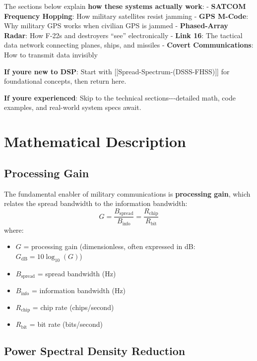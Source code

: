 The sections below explain \textbf{how these systems actually work}: -
\textbf{SATCOM Frequency Hopping}: How military satellites resist
jamming - \textbf{GPS M-Code}: Why military GPS works when civilian GPS
is jammed - \textbf{Phased-Array Radar}: How F-22s and destroyers
``see'' electronically - \textbf{Link 16}: The tactical data network
connecting planes, ships, and missiles - \textbf{Covert Communications}:
How to transmit data invisibly

\textbf{If you\textquotesingle re new to DSP}: Start with
{[}{[}Spread-Spectrum-(DSSS-FHSS){]}{]} for foundational concepts, then
return here.

\textbf{If you\textquotesingle re experienced}: Skip to the technical
sections-\/-\/-detailed math, code examples, and real-world system specs
await.

\section{Mathematical Description}

\subsection{Processing Gain}

The fundamental enabler of military communications is \textbf{processing gain}, which relates the spread bandwidth to the information bandwidth:
\begin{equation}
G = \frac{B_{\text{spread}}}{B_{\text{info}}} = \frac{R_{\text{chip}}}{R_{\text{bit}}}
\label{eq:processing-gain}
\end{equation}
where:
\begin{itemize}
\item $G$ = processing gain (dimensionless, often expressed in dB: $G_{\text{dB}} = 10\log_{10}(G)$)
\item $B_{\text{spread}}$ = spread bandwidth (Hz)
\item $B_{\text{info}}$ = information bandwidth (Hz)
\item $R_{\text{chip}}$ = chip rate (chips/second)
\item $R_{\text{bit}}$ = bit rate (bits/second)
\end{itemize}

\subsection{Power Spectral Density Reduction}

